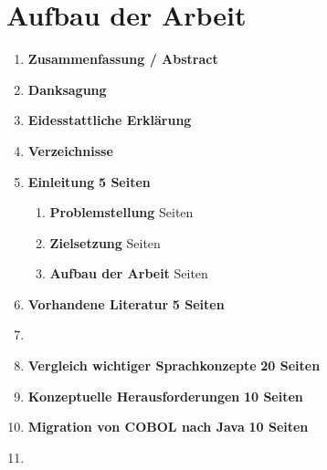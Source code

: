 \section{Aufbau der Arbeit}

\begin{framed}
\begin{enumerate}[label=\arabic*.]
    \item[] \textbf{Zusammenfassung / Abstract}

    \item[] \textbf{Danksagung}

    \item[] \textbf{Eidesstattliche Erklärung}

    \item[] \textbf{Verzeichnisse}

    \item   \textbf{Einleitung}                                         \dotfill \textbf{5 Seiten}
        \begin{enumerate}[label=\arabic*.]
            \item \textbf{Problemstellung}                               Seiten
            \item \textbf{Zielsetzung}                                   Seiten
            \item \textbf{Aufbau der Arbeit}                             Seiten
        \end{enumerate}

    \item   \textbf{Vorhandene Literatur}                               \dotfill \textbf{5 Seiten}
    
    \item[]                                                             \dotfill
    
    \item   \textbf{Vergleich wichtiger Sprachkonzepte}                 \dotfill \textbf{20 Seiten}
    
    \item   \textbf{Konzeptuelle Herausforderungen}                     \dotfill \textbf{10 Seiten}

    \item   \textbf{Migration von COBOL nach Java}                      \dotfill \textbf{10 Seiten}

    \item[]                                                             \dotfill
    

\end{enumerate}
\end{framed}
